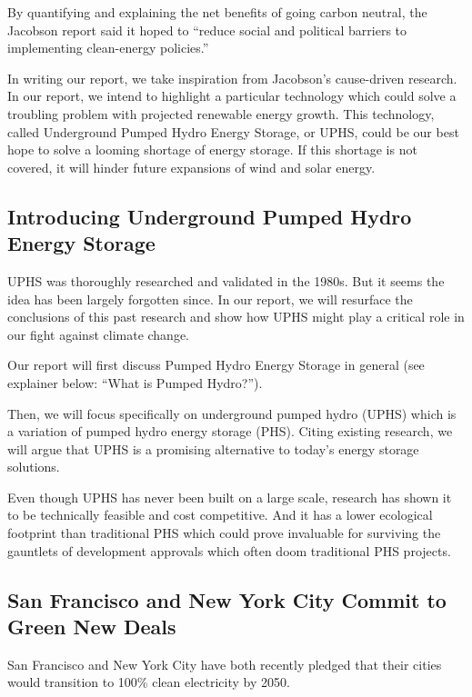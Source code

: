 \documentclass[hidelinks,12pt,a4paper]{article}
\begin{document}
By quantifying and explaining the net benefits of going carbon neutral, the Jacobson report said it hoped to “reduce social and political barriers to implementing clean-energy policies.” \cite{100PercCleanAndRenewableEnergyBy2050}

In writing our report, we take inspiration from Jacobson's cause-driven research. In our report, we intend to highlight a particular technology which could solve a troubling problem with projected renewable energy growth. This technology, called Underground Pumped Hydro Energy Storage, or UPHS, could be our best hope to solve a looming shortage of energy storage. If this shortage is not covered, it will hinder future expansions of wind and solar energy.

\subsection{Introducing Underground Pumped Hydro Energy Storage}
UPHS was thoroughly researched and validated in the 1980s. But it seems the idea has been largely forgotten since. In our report, we will resurface the conclusions of this past research and show how UPHS might play a critical role in our fight against climate change.

Our report will first discuss Pumped Hydro Energy Storage in general (see explainer below: “What is Pumped Hydro?”).

Then, we will focus specifically on underground pumped hydro (UPHS) which is a variation of pumped hydro energy storage (PHS). Citing existing research, we will argue that UPHS is a promising alternative to today's energy storage solutions.

Even though UPHS has never been built on a large scale, research has shown it to be technically feasible and cost competitive. And it has a lower ecological footprint than traditional PHS which could prove invaluable for surviving the gauntlets of development approvals which often doom traditional PHS projects.

\subsection{San Francisco and New York City Commit to Green New Deals}
San Francisco and New York City have both recently pledged that their cities would transition to 100\% clean electricity by 2050. \cite{SFNetZeroBy2050} \cite{ActionOnGlobalWarmingNYCsGreenNewDeal}
\end{document}
